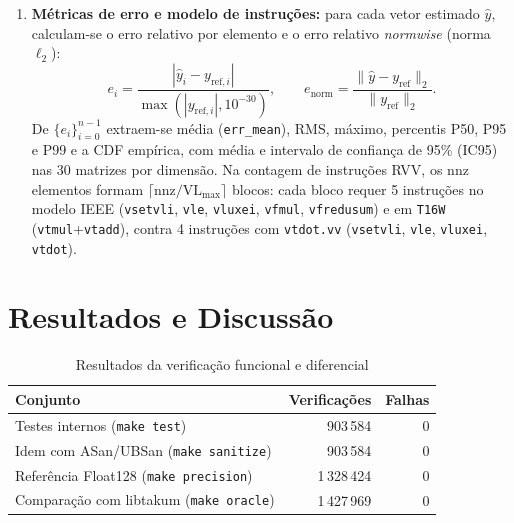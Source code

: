 \documentclass[journal]{IEEEtran}
\begin{document}
\begin{enumerate}
\begin{itemize}
arredondando cada produto e soma parcial para T16, de modo análogo a
\texttt{F16\_N}.
\end{itemize}
\item \textbf{Métricas de erro e modelo de instruções:} para cada vetor
estimado $\hat{y}$, calculam-se o erro relativo por elemento e o erro relativo
\emph{normwise} (norma $\ell_2$):
\begin{equation}
e_i = \frac{|\hat{y}_i - y_{\mathrm{ref},i}|}{\max(|y_{\mathrm{ref},i}|, 10^{-30})},
\qquad
e_{\mathrm{norm}} = \frac{\|\hat{y} - y_{\mathrm{ref}}\|_2}{\|y_{\mathrm{ref}}\|_2}.
\end{equation}
De $\{e_i\}_{i=0}^{n-1}$ extraem-se média (\texttt{err\_mean}), RMS, máximo,
percentis P50, P95 e P99 e a CDF empírica, com média e intervalo de confiança
de 95\% (IC95) nas 30 matrizes por dimensão. Na contagem de instruções RVV, os
$\mathrm{nnz}$ elementos formam $\lceil \mathrm{nnz}/\mathrm{VL}_{\max}\rceil$
blocos: cada bloco requer 5 instruções no modelo IEEE (\texttt{vsetvli},
\texttt{vle}, \texttt{vluxei}, \texttt{vfmul}, \texttt{vfredusum}) e em
\texttt{T16W} (\texttt{vtmul}+\texttt{vtadd}), contra 4 instruções com
\texttt{vtdot.vv} (\texttt{vsetvli}, \texttt{vle}, \texttt{vluxei},
\texttt{vtdot}).
\end{enumerate}

\section{Resultados e Discussão}
\label{sec:result}

\begin{table}[!t]
\renewcommand{\arraystretch}{1.12}
\caption{Resultados da verificação funcional e diferencial}
\label{tab:verif}
\centering
\begin{tabular}{l r r}
\hline
Conjunto & Verificações & Falhas \\
\hline
Testes internos (\texttt{make test})      &   903\,584 & 0 \\
Idem com ASan/UBSan (\texttt{make sanitize}) &   903\,584 & 0 \\
Referência Float128 (\texttt{make precision}) & 1\,328\,424 & 0 \\
Comparação com libtakum (\texttt{make oracle}) & 1\,427\,969 & 0 \\
\hline
\end{tabular}
\end{table}
\end{document}
